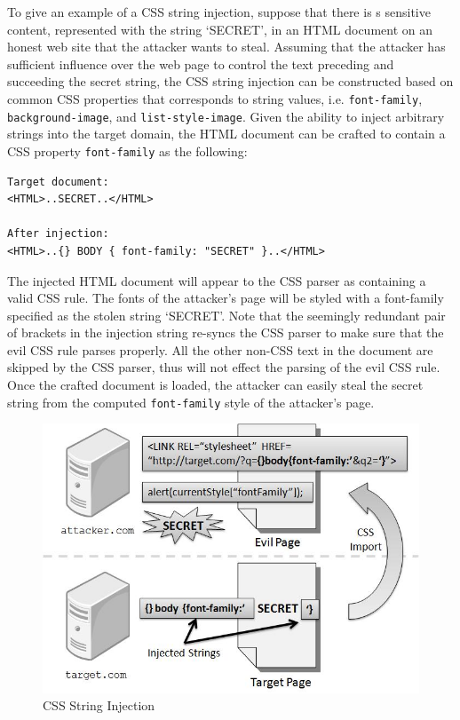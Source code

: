 \documentclass{acm_proc_article-sp}
\begin{document}
{To give an example of a CSS string injection, suppose that there is s sensitive content, represented with the string `SECRET', in an HTML document on an honest web site that the attacker wants to steal. Assuming that the attacker has sufficient influence over the web page to control the text preceding and succeeding the secret string, the CSS string injection can be constructed based on common CSS properties that corresponds to string values, i.e. \texttt{font-family}, \texttt{background-image}, and \texttt{list-style-image}. Given the ability to inject arbitrary strings into the target domain, the HTML document can be crafted to contain a CSS property \texttt{font-family} as the following:
\begin{verbatim}
Target document:
<HTML>..SECRET..</HTML>

After injection:
<HTML>..{} BODY { font-family: "SECRET" }..</HTML>
\end{verbatim}
The injected HTML document will appear to the CSS parser as containing a valid CSS rule. The fonts of the attacker's page will be styled with a font-family specified as the stolen string `SECRET'. Note that the seemingly redundant pair of brackets in the injection string re-syncs the CSS parser to make sure that the evil CSS rule parses properly. All the other non-CSS text in the document are skipped by the CSS parser, thus will not effect the parsing of the evil CSS rule. Once the crafted document is loaded, the attacker can easily steal the secret string from the computed \texttt{font-family} style of the attacker's page.

\begin{figure}
\centering
\includegraphics[width=\linewidth]{injection.jpg}
\caption{CSS String Injection}
\end{figure}

}
\end{document}
